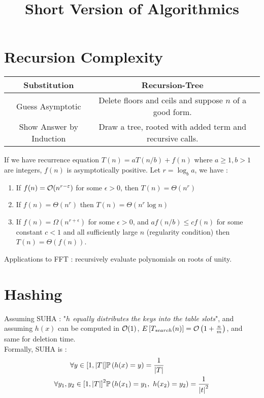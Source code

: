 \documentclass[10pt]{cours}
\begin{document}
\title{Short Version of Algorithmics}
\section{Recursion Complexity}
\begin{center}
    \begin{tabular}{ccc}
        \bf Substitution         & \bf Recursion-Tree                                       \\
        \midrule
        Guess Asymptotic         & Delete floors and ceils and suppose $n$ of a good form.  \\
        Show Answer by Induction & Draw a tree, rooted with added term and recursive calls.
    \end{tabular}
\end{center}
\begin{theorem}
    If we have recurrence equation $T(n) = aT(n/b) + f(n)$ where $a \geq 1, b > 1$ are integers, $f(n)$ is asymptotically positive. Let $r = \log_{b}a$, we have :
    \begin{enumerate}
        \item If $f(n) = \mathcal{O}(n^{r-\varepsilon})$ for some $\epsilon > 0$, then $T(n) = \Theta(n^r)$
        \item If $f(n) = \Theta(n^{r})$ then $T(n) = \Theta(n^{r}\log n)$
        \item If $f(n) = \Omega(n^{r + \epsilon})$ for some $\epsilon > 0$, and $af(n/b) \leq cf(n)$ for some constant $c < 1$ and all sufficiently large $n$ (regularity condition) then $T(n) = \Theta(f(n))$.
    \end{enumerate}
\end{theorem}

Applications to FFT : recursively evaluate polynomials on roots of unity.

\section{Hashing}
\begin{theorem}
    Assuming SUHA : "\textit{$h$ equally distributes the keys into the table slots}", and assuming $h(x)$ can be computed in $\mathcal{O}(1)$, $E\left[T_{search}(n)\right] = \mathcal{O}\left(1 + \frac{n}{m}\right)$, and same for deletion time. \\
    Formally, SUHA is :
    \[
        \begin{aligned}
            \forall y \in \left[1, \left|T\right|\right]                & \mathbb{P}\left(h(x) = y\right) = \frac{1}{\left|T\right|}                                \\
            \forall y_{1}, y_{2} \in \left[1, \left|T\right|\right]^{2} & \mathbb{P}\left(h(x_{1}) = y_{1},\ h(x_{2}) = y_{2}\right) = \frac{1}{\left|t\right|^{2}}
        \end{aligned}
    \]
\end{theorem}
\end{document}
